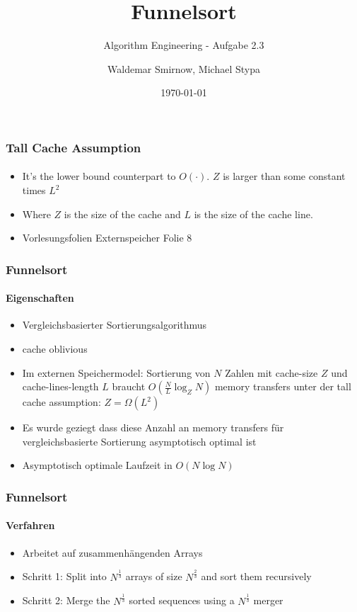 \documentclass{beamer}
\title{Funnelsort}
\subtitle{Algorithm Engineering - Aufgabe 2.3}
\author{Waldemar Smirnow, Michael Stypa}
\institute{Universität Osnabrück}
\date{\today}
\begin{document}
\begin{frame}
  \titlepage
\end{frame}

\begin{frame}
  \frametitle{Tall Cache Assumption}
  \framesubtitle{}
  \begin{center}
  \end{center}
  \begin{itemize}
    \item It's the lower bound counterpart to $O\left(⋅\right)$. $Z$ is larger than some constant times $L^2$
    \item Where $Z$ is the size of the cache and $L$ is the size of the cache line.
    \item Vorlesungsfolien Externspeicher Folie 8
  \end{itemize}
\end{frame}

\begin{frame}
  \frametitle{Funnelsort}
  \framesubtitle{Eigenschaften}
  \begin{itemize}
    \item Vergleichsbasierter Sortierungsalgorithmus
    \item cache oblivious
    \item Im externen Speichermodel: Sortierung von $N$ Zahlen
      mit cache-size $Z$ und cache-lines-length $L$
      braucht $O\left(\frac{N}{L}\log_Z{N}\right)$ memory transfers
      unter der tall cache assumption: $Z = \Omega\left(L^2\right)$
    \item Es wurde geziegt dass diese Anzahl an memory transfers
      für vergleichsbasierte Sortierung asymptotisch optimal ist
    \item Asymptotisch optimale Laufzeit in $O\left(N\log{N}\right)$
  \end{itemize}
\end{frame}

\begin{frame}
  \frametitle{Funnelsort}
  \framesubtitle{Verfahren}
  \begin{itemize}
    \item Arbeitet auf zusammenhängenden Arrays
    \item Schritt 1: Split into $N^{\frac{1}{3}}$ arrays
      of size $N^{\frac{2}{3}}$ and sort them recursively
    \item Schritt 2: Merge the $N^{\frac{1}{3}}$ sorted sequences
      using a $N^{\frac{1}{3}}$ merger
  \end{itemize}
\end{frame}
\end{document}
